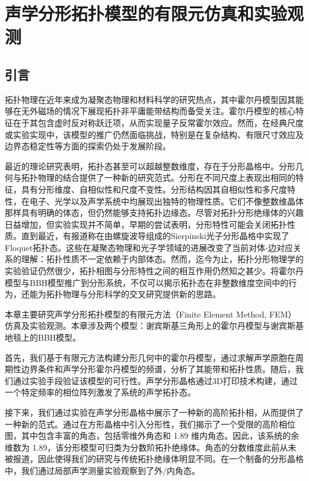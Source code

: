 \chapter{声学分形拓扑模型的有限元仿真和实验观测}
\section{引言}
拓扑物理在近年来成为凝聚态物理和材料科学的研究热点，其中霍尔丹模型因其能够在无外磁场的情况下展现拓扑非平庸能带结构而备受关注。霍尔丹模型的核心特征在于其包含虚时反对称跃迁项，从而实现量子反常霍尔效应。然而，在经典尺度或实验实现中，该模型的推广仍然面临挑战，特别是在复杂结构、有限尺寸效应及边界态稳定性等方面的探索仍处于发展阶段。

最近的理论研究表明，拓扑态甚至可以超越整数维度，存在于分形晶格中\cite{song2014topological,pai2019topological,iliasov2020hall,fremling2020existence,yang2020photonic,ivaki2022topological}。分形几何与拓扑物理的结合提供了一种新的研究范式。分形在不同尺度上表现出相同的特征，具有分形维度、自相似性和尺度不变性\cite{Mandelbrot1982,gouyet1997physics}。分形结构因其自相似性和多尺度特性，在电子、光学以及声学系统中均展现出独特的物理性质。它们不像整数维晶体那样具有明确的体态，但仍然能够支持拓扑边缘态。尽管对拓扑分形绝缘体的兴趣日益增加，但实验实现并不简单，早期的尝试\cite{liu2021sierpinski}表明，分形特性可能会关闭拓扑性质。直到最近，有报道称在由螺旋波导组成的Sierpinski光子分形晶格中实现了Floquet拓扑态\cite{yang2020photonic,biesenthal2022fractal}。这些在凝聚态物理和光子学领域的进展改变了当前对体-边对应关系的理解：拓扑性质不一定依赖于内部体态。然而，迄今为止，拓扑分形物理学的实验验证仍然很少，拓扑相图与分形特性之间的相互作用仍然知之甚少。将霍尔丹模型与BBH模型推广到分形系统，不仅可以揭示拓扑态在非整数维度空间中的行为，还能为拓扑物理与分形科学的交叉研究提供新的思路。

本章主要研究声学分形拓扑模型的有限元方法（Finite Element Method, FEM）仿真及实验观测。本章涉及两个模型：谢宾斯基三角形上的霍尔丹模型与谢宾斯基地毯上的BBH模型。

首先，我们基于有限元方法构建分形几何中的霍尔丹模型，通过求解声学原胞在周期性边界条件和声学分形霍尔丹模型的频谱，分析了其能带和拓扑性质。随后，我们通过实验手段验证该模型的可行性。声学分形晶格通过3D打印技术构建，通过一个特定频率的相位阵列激发了系统的声学拓扑态。

接下来，我们通过实验在声学分形晶格中展示了一种新的高阶拓扑相，从而提供了一种新的范式。通过在方形晶格中引入分形性，我们揭示了一个受限的高阶相位图，其中包含丰富的角态，包括零维外角态和 1.89 维内角态。因此，该系统的余维数为 1.89，该分形模型可归类为分数阶拓扑绝缘体。角态的分数维度此前从未被报道，因此使得我们的研究与传统拓扑绝缘体明显不同。在一个制备的分形晶格中，我们通过局部声学测量实验观察到了外/内角态。

